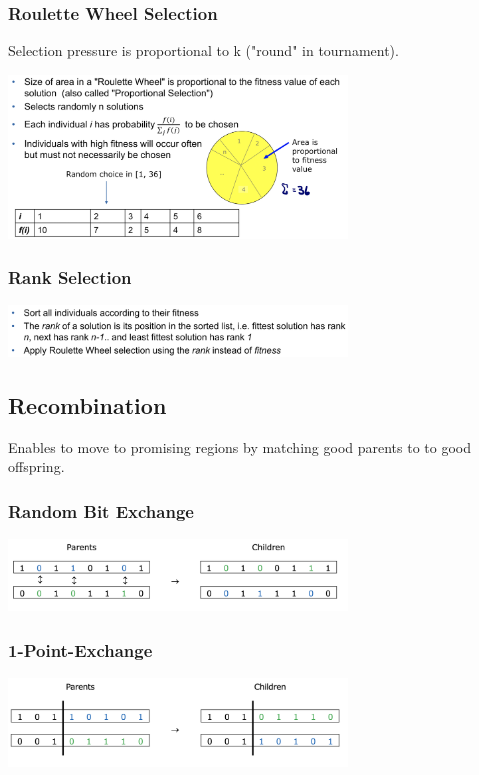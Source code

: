 \documentclass[10pt,a4paper,twocolumn]{article}
\begin{document}
\subsubsection{Roulette Wheel Selection}
Selection pressure is proportional to k ("round" in tournament).
\begin{center}
	\includegraphics[width=9cm]{images/roulette-wheel-selection}
\end{center}

\subsubsection{Rank Selection}
\begin{center}
	\includegraphics[width=9cm]{images/rank-selection}
\end{center}

\newpage
\subsection{Recombination}
Enables to move to promising regions by matching good parents to to good offspring.

\subsubsection{Random Bit Exchange}
\begin{center}
	\includegraphics[width=9cm]{images/random-bit-exchange}
\end{center}

\subsubsection{1-Point-Exchange}
\begin{center}
	\includegraphics[width=9cm]{images/1-point-exchange}
\end{center}
\end{document}
